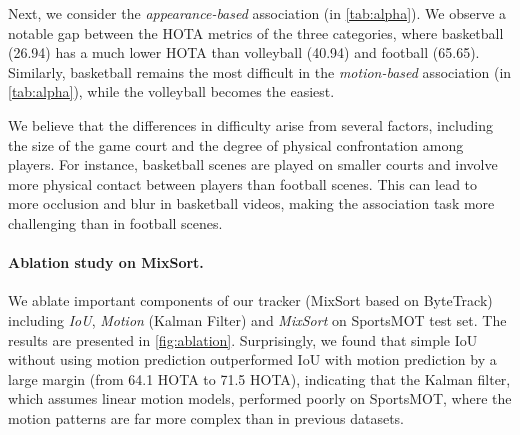 \documentclass[10pt,twocolumn,letterpaper]{article}
\begin{document}
{Next, we consider the \textit{appearance-based} association (\ie  in \cref{tab:alpha}). We observe a notable gap between the HOTA metrics of the three categories, where basketball (26.94) has a much lower HOTA than volleyball (40.94) and football (65.65). Similarly, basketball remains the most difficult in the \textit{motion-based} association (\ie  in \cref{tab:alpha}), while the volleyball becomes the easiest.

We believe that the differences in difficulty arise from several factors, including the size of the game court and the degree of physical confrontation among players. For instance, basketball scenes are played on smaller courts and involve more physical contact between players than football scenes. This can lead to more occlusion and blur in basketball videos, making the association task more challenging than in football scenes.

\begin{table}[pt]
\vspace{-3mm}
\caption{Results of the ablation experiment on SportsMOT test set. IoU means computing IoU between detections and the last location of existing tracks for association, while Motion means using Kalman filter to predict the location of tracks. The models are trained on SportsMOT training and validation set.}
\vspace{-6mm}
\label{fig:ablation}
\end{table}

\vspace{-4mm}
\paragraph{Ablation study on MixSort.}
We ablate important components of our tracker (MixSort based on ByteTrack) including \textit{IoU}, \textit{Motion} (Kalman Filter) and \textit{MixSort} on SportsMOT test set. The results are presented in \cref{fig:ablation}.
Surprisingly, we found that simple IoU without using motion prediction outperformed IoU with motion prediction by a large margin (from 64.1 HOTA to 71.5 HOTA), indicating that the Kalman filter, which assumes linear motion models, performed poorly on SportsMOT, where the motion patterns are far more complex than in previous datasets.

}
\end{document}
